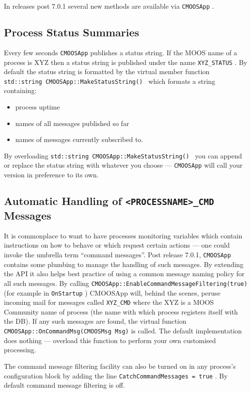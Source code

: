 \documentclass[a4paper,10pt]{article}
\newcommand{\Code}[1]{\texttt{#1} }
\newcommand{\code}[1]{\Code{#1} }
\begin{document}
In releases post 7.0.1 several new methods are available via \code{CMOOSApp}.

\subsection{Process Status Summaries}

Every few seconds \code{CMOOSApp} publishes a status string. If the MOOS name of a process is XYZ then a status string is published under the name \code{XYZ\_STATUS}. By default the status string is formatted by the virtual member function \code{std::string CMOOSApp::MakeStatusString() } which formats a string containing:
\begin{itemize}
\item process uptime
\item names of all messages published so far
\item names of messages currently subscribed to.
\end{itemize}

By overloading \code{std::string CMOOSApp::MakeStatusString() } you can append or replace the status string with whatever you choose --- \code{CMOOSApp} will call your version in preference to its own.

\subsection{Automatic Handling of \code{<PROCESSNAME>\_CMD} Messages}

It is commonplace to want to have processes monitoring variables which contain instructions on how to behave or which request certain actions --- one could invoke the umbrella term ``command messages''. Post release 7.0.1,  \code{CMOOSApp} contains some plumbing to manage the handling of such messages. By extending the API it also helps best practice of using a common message naming policy for all such messages.
By calling \code{CMOOSApp::EnableCommandMessageFiltering(true)} (for example in \code{OnStartup}) CMOOSApp will, behind the scenes, peruse incoming mail for messages called \code{XYZ\_CMD} where the XYZ is a MOOS Community name of process (the name with which process registers itself with the DB). If any such messages are found, the virtual function \code{CMOOSApp::OnCommandMsg(CMOOSMsg Msg)} is called. The default implementation does nothing --- overload this function to perform your own customised processing.

The command message filtering facility can also be turned on in any process's  configuration block by adding the line \code{CatchCommandMessages = true}. By default command message filtering is off.
\end{document}
